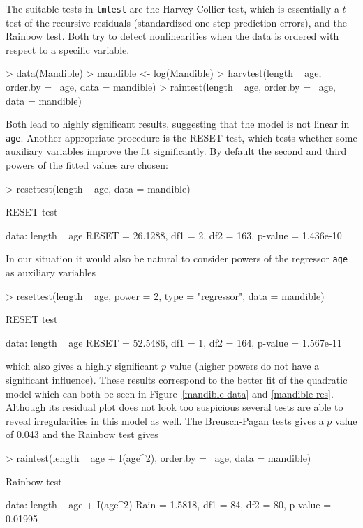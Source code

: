 \documentclass[a4paper]{article}
\begin{document}
The suitable tests in \texttt{lmtest} are the Harvey-Collier test,
which is essentially a $t$ test
of the recursive residuals (standardized one step prediction errors),
and the Rainbow test. Both try to detect
nonlinearities when the data is ordered with respect to a specific
variable.
\begin{Schunk}
\begin{Sinput}
> data(Mandible)
> mandible <- log(Mandible)
> harvtest(length ~ age, order.by = ~age, data = mandible)
> raintest(length ~ age, order.by = ~age, data = mandible)
\end{Sinput}
\end{Schunk}
Both lead to highly significant results, suggesting that the model
is not linear in \texttt{age}. Another appropriate procedure is
the RESET test, which tests whether some
auxiliary variables improve the fit significantly. By default
the second and third powers of the fitted values are chosen:
\begin{Schunk}
\begin{Sinput}
> resettest(length ~ age, data = mandible)
\end{Sinput}
\begin{Soutput}
	RESET test

data:  length ~ age 
RESET = 26.1288, df1 = 2, df2 = 163, p-value = 1.436e-10
\end{Soutput}
\end{Schunk}
In our situation it would also be natural to consider powers of
the regressor \texttt{age} as auxiliary variables
\begin{Schunk}
\begin{Sinput}
> resettest(length ~ age, power = 2, type = "regressor", data = mandible)
\end{Sinput}
\begin{Soutput}
	RESET test

data:  length ~ age 
RESET = 52.5486, df1 = 1, df2 = 164, p-value = 1.567e-11
\end{Soutput}
\end{Schunk}
which also gives a highly significant $p$ value (higher powers do not
have a significant influence). These results correspond to the better
fit of the quadratic model which can both be seen in Figure~\ref{mandible-data}
and \ref{mandible-res}. Although its residual plot does not look too
suspicious several tests are able to reveal irregularities in this model
as well. The Breusch-Pagan tests gives a $p$ value of
0.043
and the Rainbow test gives
\begin{Schunk}
\begin{Sinput}
> raintest(length ~ age + I(age^2), order.by = ~age, data = mandible)
\end{Sinput}
\begin{Soutput}
	Rainbow test

data:  length ~ age + I(age^2) 
Rain = 1.5818, df1 = 84, df2 = 80, p-value = 0.01995
\end{Soutput}
\end{Schunk}
\end{document}
